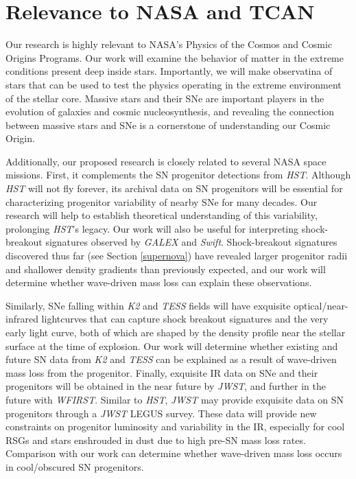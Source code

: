 {\color{orange}

\section{Relevance to NASA and TCAN}



Our research is highly relevant to NASA's Physics of the Cosmos and Cosmic Origins Programs. Our work will examine the behavior of matter in the extreme conditions present deep inside stars. Importantly, we will make observatina of stars that can be used to test the physics operating in the extreme environment of the stellar core. Massive stars and their SNe are important players in the evolution of galaxies and cosmic nucleosynthesis, and revealing the connection between massive stars and SNe is a cornerstone of understanding our Cosmic Origin.

Additionally, our proposed research is closely related to several NASA space missions. First, it complements the SN progenitor detections from {\it HST}. Although {\it HST} will not fly forever, its archival data on SN progenitors will be essential for characterizing progenitor variability of nearby SNe for many decades. Our research will help to establish theoretical understanding of this variability, prolonging {\it HST}'s legacy. Our work will also be useful for interpreting shock-breakout signatures observed by {\it GALEX} and {\it Swift}. Shock-breakout signatures discovered thus far (see Section \ref{supernova}) have revealed larger progenitor radii and shallower density gradients than previously expected, and our work will determine whether wave-driven mass loss can explain these observations.

Similarly, SNe falling within {\it K2} and {\it TESS} fields will have exquisite optical/near-infrared lightcurves that can capture shock breakout signatures and the very early light curve, both of which are shaped by the density profile near the stellar surface at the time of explosion. Our work will determine whether existing and future SN data from {\it K2} and {\it TESS} can be explained as a result of wave-driven mass loss from the progenitor. Finally, exquisite IR data on SNe and their progenitors will be obtained in the near future by {\it JWST}, and further in the future with {\it WFIRST}. Similar to {\it HST}, {\it JWST} may provide exquisite data on SN progenitors through a {\it JWST} LEGUS survey. These data will provide new constraints on progenitor luminosity and variability in the IR, especially for cool RSGs and stars enshrouded in dust due to high pre-SN mass loss rates. Comparison with our work can determine whether wave-driven mass loss occurs in cool/obscured SN progenitors.


}